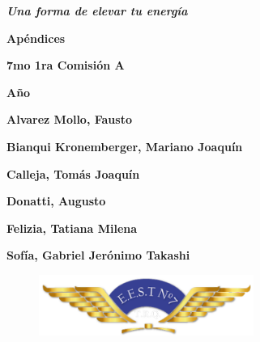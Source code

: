 \documentclass[28pt, a4paper]{report}
\begin{document}
\begin{titlepage}
\begin{center}
                \vspace{0.5cm}
                {\LARGE\textbf{{\textcolor{dark_violet}{\textbf{\textit{Una forma de elevar tu energía}}}}}}\par
                \vspace{0.5cm}
            {\Huge\textbf{Apéndices}}\par
                \vspace{1cm}
            {\LARGE\textbf{7mo 1ra Comisión A}}\par
                \vspace{0.2cm}
            {\LARGE\textbf{Año \the\year}}\par
                \vspace{1cm}
            {\Large\textbf{{Alvarez Mollo, Fausto}}}\par
            {\Large\textbf{{Bianqui Kronemberger, Mariano Joaquín}}}\par
            {\Large\textbf{{Calleja, Tomás Joaquín}}}\par
            {\Large\textbf{{Donatti, Augusto}}}\par
            {\Large\textbf{{Felizia, Tatiana Milena}}}\par
            {\Large\textbf{{Sofía, Gabriel Jerónimo Takashi}}}\par
                \vspace{1.5cm}
            \begin{figure} [!ht]
                \centering
                \includegraphics [width=7cm]{Imagenes/Preface/IMPA.png}
                \label{IMPA}
            \end{figure}
        \end{center}
        
    \end{titlepage}
    
    \tableofcontents
    \newpage

    
    
    
    
\end{document}
